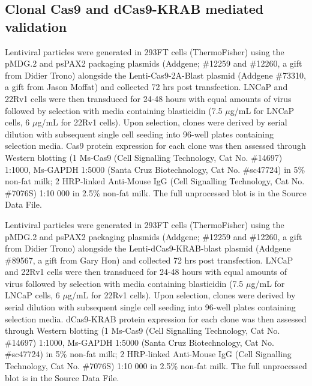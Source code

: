 \subsection{Clonal  Cas9 and dCas9-KRAB mediated validation}

Lentiviral particles were generated in 293FT cells (ThermoFisher) using the pMDG.2 and psPAX2 packaging plasmids (Addgene; \#12259 and \#12260, a gift from Didier Trono) alongside the Lenti-Cas9-2A-Blast plasmid (Addgene \#73310, a gift from Jason Moffat) and collected 72 hrs post transfection.
LNCaP and 22Rv1 cells were then transduced for 24-48 hours with equal amounts of virus followed by selection with media containing blasticidin (7.5 $\mu$g/mL for LNCaP cells, 6 $\mu$g/mL for 22Rv1 cells).
Upon selection, clones were derived by serial dilution with subsequent single cell seeding into 96-well plates containing selection media.
Cas9 protein expression for each clone was then assessed through Western blotting (1 \textdegree Ms-Cas9 (Cell Signalling Technology, Cat No. \#14697) 1:1000, Ms-GAPDH 1:5000 (Santa Cruz Biotechnology, Cat No. \#sc47724) in 5\% non-fat milk; 2 \textdegree HRP-linked Anti-Mouse IgG (Cell Signalling Technology, Cat No. \#7076S) 1:10 000 in 2.5\% non-fat milk.
The full unprocessed blot is in the Source Data File.

Lentiviral particles were generated in 293FT cells (ThermoFisher) using the pMDG.2 and psPAX2 packaging plasmids (Addgene; \#12259 and \#12260, a gift from Didier Trono) alongside the Lenti-dCas9-KRAB-blast plasmid (Addgene \#89567, a gift from Gary Hon) and collected 72 hrs post transfection.
LNCaP and 22Rv1 cells were then transduced for 24-48 hours with equal amounts of virus followed by selection with media containing blasticidin (7.5 $\mu$g/mL for LNCaP cells, 6 $\mu$g/mL for 22Rv1 cells).
Upon selection, clones were derived by serial dilution with subsequent single cell seeding into 96-well plates containing selection media.
dCas9-KRAB protein expression for each clone was then assessed through Western blotting (1 \textdegree Ms-Cas9 (Cell Signalling Technology, Cat No. \#14697) 1:1000, Ms-GAPDH 1:5000 (Santa Cruz Biotechnology, Cat No. \#sc47724) in 5\% non-fat milk; 2 \textdegree HRP-linked Anti-Mouse IgG (Cell Signalling Technology, Cat No. \#7076S) 1:10 000 in 2.5\% non-fat milk.
The full unprocessed blot is in the Source Data File.

